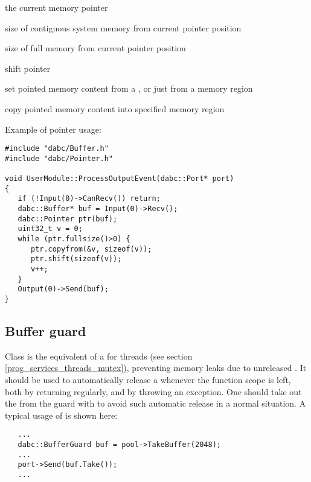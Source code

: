 \item[\func{ptr()} or \func{operator()}]   the current memory pointer

\item[\func{rawsize()}]   size of contiguous system memory from current pointer position  

\item[\func{fullsize()}]  size of full memory from current pointer position

\item[\func{shift()}]  shift pointer    

\item[\func{copyfrom()}]  set pointed memory content from a , 
or just from a memory region

\item[\func{copyto()}]  copy pointed memory content into specified memory region
\ebul   

Example of pointer usage:

\begin{small}
\begin{verbatim}     
#include "dabc/Buffer.h"
#include "dabc/Pointer.h"

void UserModule::ProcessOutputEvent(dabc::Port* port)
{
   if (!Input(0)->CanRecv()) return;
   dabc::Buffer* buf = Input(0)->Recv();
   dabc::Pointer ptr(buf);
   uint32_t v = 0; 
   while (ptr.fullsize()>0) {
      ptr.copyfrom(&v, sizeof(v));
      ptr.shift(sizeof(v));
      v++;
   }
   Output(0)->Send(buf);
}
\end{verbatim}     
\end{small}



\subsection{Buffer guard}
\label{prog_services_memory_bufferguard}
Class 
is the equivalent of a  for threads (see section
\ref{prog_services_threads_mutex}),
preventing memory leaks due to unreleased .
It should be used to automatically release a 
whenever the function scope is left, both by returning regularly, 
and by throwing an exception. 
One should  take out the  from the guard
with 
to avoid such automatic release in a normal situation. A typical usage 
of  is shown here:

\begin{small}
\begin{verbatim}     
   ...
   dabc::BufferGuard buf = pool->TakeBuffer(2048);
   ...
   port->Send(buf.Take());
   ...
\end{verbatim}     
\end{small}

